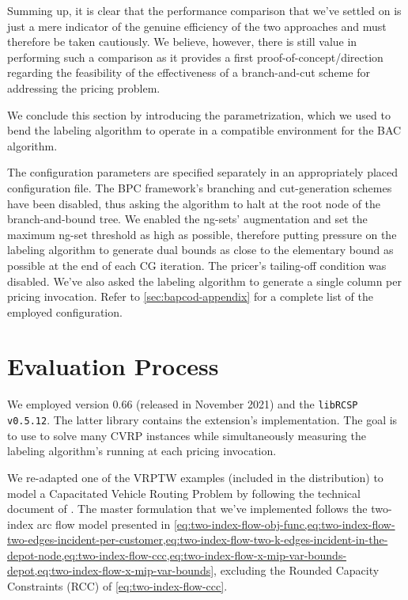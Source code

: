 Summing up, it is clear that the performance comparison that we've settled on is just
a mere indicator of the genuine efficiency of the two approaches and must
therefore be taken cautiously.
We believe, however, there is still value in performing such a comparison as it provides
a first proof-of-concept/direction regarding the feasibility of the effectiveness
of a branch-and-cut scheme for addressing the pricing problem.

\medskip

We conclude this section by introducing the \bapcod{} parametrization,
which we used to bend the labeling algorithm to operate in a compatible environment for the BAC algorithm.

The configuration parameters are specified separately
in an appropriately placed configuration file.
The BPC framework's branching and cut-generation schemes have been disabled,
thus asking the algorithm to halt at the root node of the branch-and-bound tree.
We enabled the ng-sets' augmentation and set the maximum ng-set threshold as high as possible,
therefore putting pressure on the labeling algorithm to generate dual bounds as close
to the elementary bound as possible at the end of each CG iteration.
The pricer's tailing-off condition was disabled.
We've also asked the labeling algorithm to generate
a single column per pricing invocation.
Refer to \cref{sec:bapcod-appendix} for a complete list of the employed configuration.

\section{Evaluation Process}
\label{sec:results-evaluation-process}

We employed \bapcod{} version 0.66 (released in November 2021) and the \texttt{libRCSP v0.5.12}.
The latter library contains the \vrpsolver{} extension's implementation.
The goal is to use \bapcod{} to solve many CVRP instances while simultaneously
measuring the labeling algorithm's running at each pricing invocation.

\medskip

We re-adapted one of the VRPTW examples (included in the distribution)
to model a Capacitated Vehicle Routing Problem by following
the \bapcod{} technical document of \textcite{sadykov2021}.
The master formulation that we've implemented follows the two-index arc flow model
presented in \cref{eq:two-index-flow-obj-func,eq:two-index-flow-two-edges-incident-per-customer,eq:two-index-flow-two-k-edges-incident-in-the-depot-node,eq:two-index-flow-ccc,eq:two-index-flow-x-mip-var-bounds-depot,eq:two-index-flow-x-mip-var-bounds},
excluding the Rounded Capacity Constraints (RCC) of \cref{eq:two-index-flow-ccc}.

